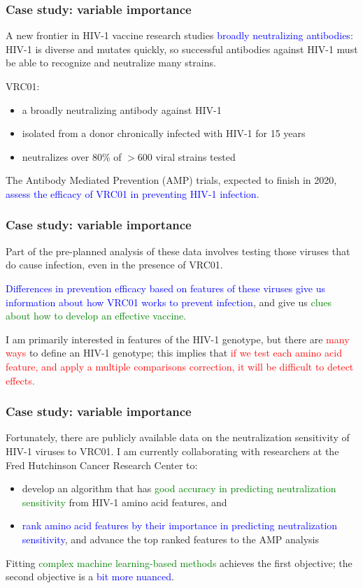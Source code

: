 \documentclass[12pt, 
hyperref={colorlinks=true, linkcolor=blue, urlcolor=cyan}]{beamer}
\begin{document}
\begin{frame}
\frametitle{Case study: variable importance}
A new frontier in HIV-1 vaccine research studies \textcolor{blue}{broadly neutralizing antibodies}: HIV-1 is diverse and mutates quickly, so successful antibodies against HIV-1 must be able to recognize and neutralize many strains.

VRC01: \vspace{-0.3cm}
\begin{itemize}
\item a broadly neutralizing antibody against HIV-1
\item isolated from a donor chronically infected with HIV-1 for 15 years
\item neutralizes over 80\% of $> 600$ viral strains tested
\end{itemize}

The Antibody Mediated Prevention (AMP) trials, expected to finish in 2020, \textcolor{blue}{assess the efficacy of VRC01 in preventing HIV-1 infection}.
\end{frame}

\begin{frame}
\frametitle{Case study: variable importance}
Part of the pre-planned analysis of these data involves testing those viruses that do cause infection, even in the presence of VRC01.

\textcolor{blue}{Differences in prevention efficacy based on features of these viruses give us information about how VRC01 works to prevent infection}, and give us \textcolor{green}{clues about how to develop an effective vaccine.}

I am primarily interested in features of the HIV-1 genotype, but there are \textcolor{red}{many ways} to define an HIV-1 genotype; this implies that \textcolor{red}{if we test each amino acid feature, and apply a multiple comparisons correction, it will be difficult to detect effects. }
\end{frame}

\begin{frame}
\frametitle{Case study: variable importance}
Fortunately, there are publicly available data on the neutralization sensitivity of HIV-1 viruses to VRC01. I am currently collaborating with researchers at the Fred Hutchinson Cancer Research Center to:
\begin{itemize}
\item develop an algorithm that has \textcolor{green}{good accuracy in predicting neutralization sensitivity} from HIV-1 amino acid features, and
\item \textcolor{blue}{rank amino acid features by their importance in predicting neutralization sensitivity}, and advance the top ranked features to the AMP analysis
\end{itemize}

Fitting \textcolor{green}{complex machine learning-based methods} achieves the first objective; the second objective is a \textcolor{blue}{bit more nuanced}.
\end{frame}
\end{document}
